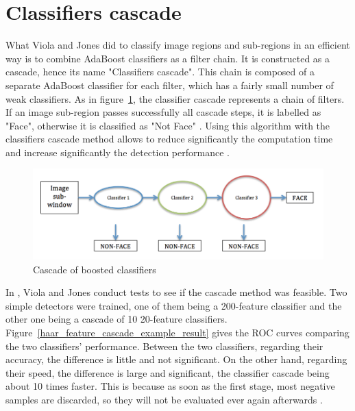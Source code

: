\section{Classifiers cascade}

\vspace{\baselineskip}
\noindent What Viola and Jones did to classify image regions and sub-regions in an efficient way is to combine AdaBoost classifiers as a filter chain. It is constructed as a cascade, hence its name  "Classifiers cascade". This chain is composed of a separate AdaBoost classifier for each filter, which has a fairly small number of weak classifiers. As in figure~\ref{haar_feature_cascade}, the classifier cascade represents a chain of filters. If an image sub-region passes successfully all cascade steps, it is labelled as "Face", otherwise it is classified as "Not Face" \cite{HEW07}. Using this algorithm with the classifiers cascade method allows to reduce significantly the computation time and increase significantly the detection performance \cite{VIO01}.
\newline

\begin{figure}[!h]
\begin{center}
\noindent \includegraphics[scale=0.5]{figures/haar_feature_cascade} 
\newline
\caption{Cascade of boosted classifiers}
\label{haar_feature_cascade}
\end{center} 
\end{figure}

\noindent In \cite{VIO01}, Viola and Jones conduct tests to see if the cascade method was feasible. Two simple detectors were trained, one of them being a 200-feature classifier and the other one being a cascade of 10 20-feature classifiers. Figure~\ref{haar_feature_cascade_example_result} gives the ROC curves comparing the two classifiers' performance. Between the two classifiers, regarding their accuracy, the difference is little and not significant. On the other hand, regarding their speed, the difference is large and significant, the classifier cascade being about 10 times faster. This is because as soon as the first stage, most negative samples are discarded, so they will not be evaluated ever again afterwards \cite{VIO01}.
\newline

